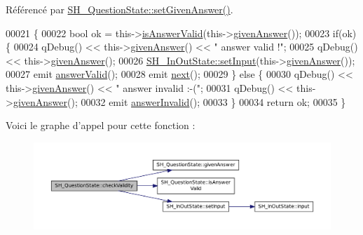 Référencé par \hyperlink{classSH__QuestionState_a9d285a34a7002fd05a7fa8ff9139c264}{S\-H\-\_\-\-Question\-State\-::set\-Given\-Answer()}.


\begin{DoxyCode}
00021 \{
00022     \textcolor{keywordtype}{bool} ok = this->\hyperlink{classSH__QuestionState_ac195d7ad87a52ab276a7c4a902eab691}{isAnswerValid}(this->\hyperlink{classSH__QuestionState_abde97c61175be95358ece622fd16593e}{givenAnswer}());
00023     \textcolor{keywordflow}{if}(ok) \{
00024         qDebug() << this->\hyperlink{classSH__QuestionState_abde97c61175be95358ece622fd16593e}{givenAnswer}() << \textcolor{stringliteral}{" answer valid !"};
00025         qDebug() << this->\hyperlink{classSH__QuestionState_abde97c61175be95358ece622fd16593e}{givenAnswer}();
00026         \hyperlink{classSH__InOutState_a0206ab7d5616f28b0da7bfd5451614e8}{SH\_InOutState::setInput}(this->\hyperlink{classSH__QuestionState_abde97c61175be95358ece622fd16593e}{givenAnswer}());
00027         emit \hyperlink{classSH__QuestionState_a04e259643788d15ab6244bc8a04286d6}{answerValid}();
00028         emit \hyperlink{classSH__GenericState_a030e67a872956135c52e6876d960a7b5}{next}();
00029     \} \textcolor{keywordflow}{else} \{
00030         qDebug() << this->\hyperlink{classSH__QuestionState_abde97c61175be95358ece622fd16593e}{givenAnswer}() << \textcolor{stringliteral}{" answer invalid :-("};
00031         qDebug() << this->\hyperlink{classSH__QuestionState_abde97c61175be95358ece622fd16593e}{givenAnswer}();
00032         emit \hyperlink{classSH__QuestionState_a3348a8a683130678ac87a10ba2a25486}{answerInvalid}();
00033     \}
00034     \textcolor{keywordflow}{return} ok;
00035 \}
\end{DoxyCode}


Voici le graphe d'appel pour cette fonction \-:
\nopagebreak
\begin{figure}[H]
\begin{center}
\leavevmode
\includegraphics[width=350pt]{classSH__QuestionState_a3ca5459c20ef591023c0572d8224146c_cgraph}
\end{center}
\end{figure}




